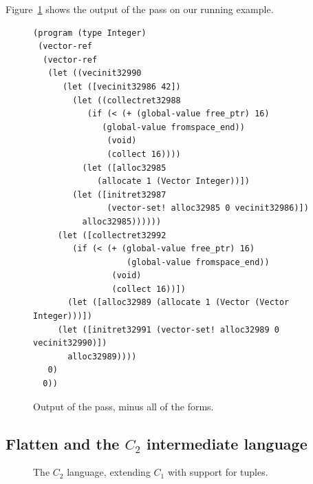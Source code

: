\documentclass[11pt]{book}
\newcommand{\gray}[1]{{\color{lightgray} #1}}
\begin{document}
Figure~\ref{fig:expose-alloc-output} shows the output of the
 pass on our running example.

\begin{figure}[tbp]
\begin{lstlisting}
(program (type Integer)
 (vector-ref
  (vector-ref
   (let ((vecinit32990
	  (let ([vecinit32986 42])
	    (let ((collectret32988
		   (if (< (+ (global-value free_ptr) 16)
			  (global-value fromspace_end))
		       (void)
		       (collect 16))))
	      (let ([alloc32985
		     (allocate 1 (Vector Integer))])
		(let ([initret32987
		       (vector-set! alloc32985 0 vecinit32986)])
		  alloc32985))))))
     (let ([collectret32992
	    (if (< (+ (global-value free_ptr) 16)
                   (global-value fromspace_end))
                (void)
                (collect 16))])
       (let ([alloc32989 (allocate 1 (Vector (Vector Integer)))])
	 (let ([initret32991 (vector-set! alloc32989 0 vecinit32990)])
	   alloc32989))))
   0)
  0))
\end{lstlisting}
\caption{Output of the  pass, minus
  all of the  forms.}
\label{fig:expose-alloc-output}
\end{figure}


\clearpage

\subsection{Flatten and the $C_2$ intermediate language}
\label{sec:flatten-gc}

\begin{figure}[tp]
\fbox{
\begin{minipage}{0.96\textwidth}
\[
\begin{array}{lcl}
\Arg &::=& \gray{ \Int \mid \Var \mid \key{\#t} \mid \key{\#f} }\\
\itm{cmp} &::= & \gray{  \key{eq?} \mid \key{<} \mid \key{<=} \mid \key{>} \mid \key{>=}  } \\
\Exp &::= & \gray{ \Arg \mid (\key{read}) \mid (\key{-}\;\Arg) \mid (\key{+} \; \Arg\;\Arg)
      \mid (\key{not}\;\Arg) \mid (\itm{cmp}\;\Arg\;\Arg)  } \\
   &\mid& (\key{allocate} \,\itm{int}\,\itm{type})
   \mid (\key{vector-ref}\, \Arg\, \Int)  \\
   &\mid& (\key{vector-set!}\,\Arg\,\Int\,\Arg)
    \mid (\key{global-value} \,\itm{name}) \mid (\key{void}) \\
\Stmt &::=& \gray{ \ASSIGN{\Var}{\Exp} \mid \RETURN{\Arg} } \\
      &\mid& \gray{ \IF{(\itm{cmp}\, \Arg\,\Arg)}{\Stmt^{*}}{\Stmt^{*}} } \\
      &\mid& (\key{collect} \,\itm{int}) \\
C_2 & ::= & \gray{ (\key{program}\;(\Var^{*})\;(\key{type}\;\textit{type})\;\Stmt^{+}) }
\end{array}
\]
\end{minipage}
}
\caption{The $C_2$ language, extending $C_1$ with support for tuples.}
\label{fig:c2-syntax}
\end{figure}
\end{document}
